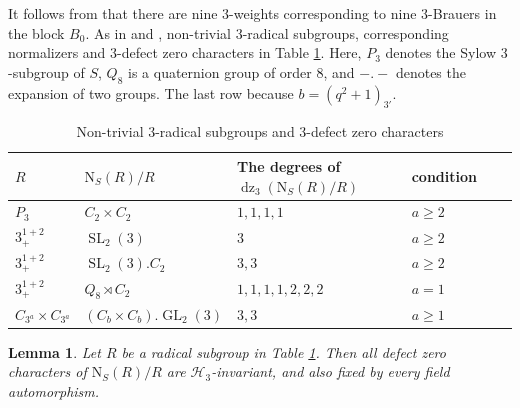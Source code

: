 \documentclass[11pt,a4paper]{article}
\numberwithin{equation}{section}
\newtheorem{lemma}[theorem]{Lemma}
\theoremstyle{definition}
\theoremstyle{remark}
\newcommand{\GL}{\operatorname{GL}}
\newcommand{\SL}{\operatorname{SL}}
\newcommand{\dz}{\operatorname{dz}}
\newcommand{\HH}{\mathcal H}
\newcommand{\NN}{\mathrm N}
\begin{document}
It follows from  \cite[Theorem 5.1]{Malle} that there are nine $3$-weights corresponding to nine $3$-Brauers in the block $B_0$. As in \cite[Table 4]{Malle} and \cite[(2B)]{An}, non-trivial $3$-radical subgroups, corresponding normalizers and  $3$-defect  zero characters in Table \ref{tab:3}. Here,  $P_3$ denotes the Sylow $3$-subgroup of $S$, $Q_8$ is a quaternion group of order $8$, and ${-}.{-}$ denotes the expansion of two groups. The last row because $b = (q^2 + 1)_{3'}$.
\begin{table}[ht]
\centering
\caption{Non-trivial \(3\)-radical subgroups and  $3$-defect  zero characters}\label{tab:3}
\begin{tabular}{@{}llllrr@{}}
\toprule
$R$ & $\NN_S(R)/R$ & The degrees of $\dz_3(\NN_S(R)/R)$& condition\\
\midrule
$P_3$ & $C_2\times C_2$ & $1,1,1,1$& $a\geq 2$\\
$3^{1+2}_+$ & $\SL_2(3)$ & $3$& $a\geq 2$\\
$3^{1+2}_+$ & $\SL_2(3).C_2$ & $3,3$& $a\geq 2$\\
$3^{1+2}_+$ & $Q_8\rtimes C_2$ & $ 1,1,1,1,2,2,2$& $a=1$\\
$C_{3^a}\times C_{3^a}$ &$(C_b\times C_b).\GL_2(3)$& $3,3$& $a\geq 1$ \\
\bottomrule
\end{tabular}
\end{table}
\begin{lemma}\label{lem:3.15}
Let $R$ be a radical subgroup in  Table \ref{tab:3}.
Then all defect zero characters of $\NN_S(R)/R$ are
$\HH_3$-invariant, and also fixed by every field automorphism.
\end{lemma}
\end{document}
